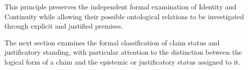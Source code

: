 This principle preserves
the independent
formal examination
of Identity and
Continuity while
allowing their possible
ontological relations
to be investigated
through explicit
and justified premises.

The next section
examines the formal
classification of
claim status and
justificatory standing,
with particular attention
to the distinction
between the logical
form of a claim
and the epistemic
or justificatory
status assigned
to it.

